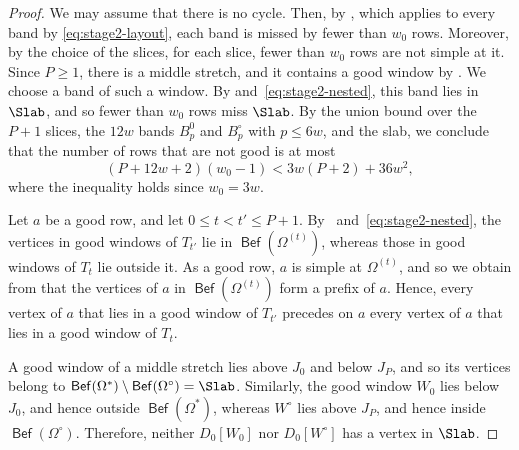 \documentclass[fontsize=12pt,leading=14pt]{fullpaper}
\DeclareMathOperator{\Bef}{\mathsf{Bef}}
\begin{document}
\begin{proof}
  We may assume that there is no cycle.
  Then, by , which applies to every band by \eqref{eq:stage2-layout}, each band is missed by fewer than $w_0$ rows.
  Moreover, by the choice of the slices, for each slice, fewer than $w_0$ rows are not simple at it.
  Since $P\ge1$, there is a middle stretch, and it contains a good window by .
  We choose a band of such a window.
  By  and~\eqref{eq:stage2-nested}, this band lies in $\Slab$, and so fewer than $w_0$ rows miss $\Slab$.
  By the union bound over the $P+1$ slices, the $12w$ bands $B^0_p$ and $B^\circ_p$ with $p\le6w$, and the slab, we conclude that the number of rows that are not good is at most
  \[
    (P+12w+2)(w_0-1)<3w(P+2)+36w^2,
  \]
  where the inequality holds since $w_0=3w$.

  Let $a$ be a good row, and let $0\le t<t'\le P+1$.
  By~ and~\eqref{eq:stage2-nested}, the vertices in good windows of $T_{t'}$ lie in $\Bef(\Omega^{(t)})$, whereas those in good windows of $T_t$ lie outside it.
  As a good row, $a$ is simple at $\Omega^{(t)}$, and so we obtain from  that the vertices of $a$ in $\Bef(\Omega^{(t)})$ form a prefix of $a$.
  Hence, every vertex of $a$ that lies in a good window of $T_{t'}$ precedes on $a$ every vertex of $a$ that lies in a good window of $T_t$.

  A good window of a middle stretch lies above $J_0$ and below $J_P$, and so its vertices belong to $\Bef(\Omega^*)\setminus\Bef(\Omega^\circ)=\Slab$.
  Similarly, the good window $W_0$ lies below $J_0$, and hence outside $\Bef(\Omega^*)$, whereas $W^\circ$ lies above $J_P$, and hence inside $\Bef(\Omega^\circ)$.
  Therefore, neither $D_0[W_0]$ nor $D_0[W^\circ]$ has a vertex in $\Slab$.


\end{proof}
\end{document}
